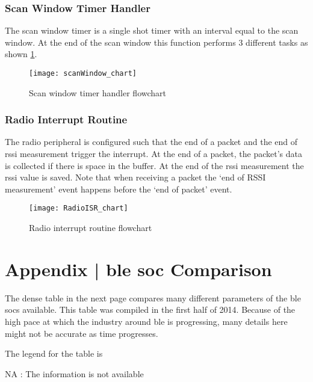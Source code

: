 \subsection{Scan Window Timer Handler}
The scan window timer is a single shot timer with an interval equal to the scan window. At the end of the scan window this function performs 3 different tasks as shown \ref{fig:scanWindow_chart}.
\begin{figure}[h]
\centering
\vspace{20pt}
\texttt{[image: scanWindow\_chart]}
\caption{Scan window timer handler flowchart}
\label{fig:scanWindow_chart}
\end{figure}
\clearpage

\subsection{Radio Interrupt Routine}
The radio peripheral is configured such that the end of a packet and the end of \acrshort{rssi} measurement trigger the interrupt. At the end of a packet, the packet's data is collected if there is space in the buffer. At the end of the \acrshort{rssi} measurement the \acrshort{rssi} value is saved. Note that when receiving a packet the `end of RSSI measurement' event happens before the `end of packet' event. 

\begin{figure}[h]
\centering
\vspace{-10pt}
\texttt{[image: RadioISR\_chart]}
\caption{Radio interrupt routine flowchart}
\label{fig:RadioISR_chart}
\vspace{-10pt}
\end{figure}

\chapter{Appendix | \gls{ble} \gls{soc} Comparison} \label{ApdxSoC}
The dense table in the next page compares many different parameters of the \gls{ble} \glspl{soc} available. This table was compiled in the first half of 2014. Because of the high pace at which the industry around \gls{ble} is progressing, many details here might not be accurate as time progresses.

The legend for the table is

\vspace{10pt}
NA \hspace{10pt}: The information is not available


